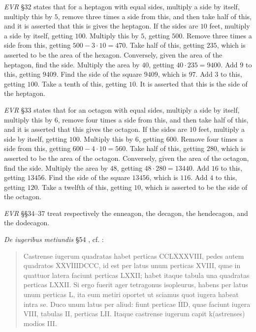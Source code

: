 \documentclass{amsart}
\theoremstyle{definition}
\begin{document}
{\em EVR} \S 32 \cite[pp.~176--179]{guillaumin} states that for a heptagon with equal sides, multiply a side by
itself, multiply this by $5$, remove three times a side from this, and then take half of this, and it is asserted that
this is gives the heptagon. If the sides are $10$ feet,
multiply a side by itself, getting $100$. Multiply this by $5$, getting $500$. Remove three times a side from this,
getting $500-3\cdot 10=470$. Take half of this, getting $235$, which is asserted to be the area of the hexagon.
Conversely,
given the area of the heptagon, find the side. Multiply the area by $40$, getting $40 \cdot 235 = 9400$.
Add $9$ to this, getting $9409$. Find the side of the square $9409$, which is $97$. Add $3$ to this, getting $100$.
Take a tenth of this, getting $10$. It is asserted that this is the side of the heptagon.

{\em EVR} \S 33 \cite[pp.~178--179]{guillaumin} states that for an octagon with equal sides, 
multiply a side by itself, multiply this by $6$, remove four times a side from this, and then take half of this, and it is asserted that this gives the octagon.
If the sides are $10$ feet, multiply a side by itself, getting $100$. Multiply this by $6$, getting $600$. Remove four times a side from this,
getting $600-4\cdot 10=560$. Take half of this, getting $280$, which is asserted to be the area of the octagon. Conversely,
given the area of the octagon, find the side. Multiply the area by $48$, getting $48 \cdot 280 = 13440$. Add $16$ to this, getting $13456$. Find the side
of the square $13456$, which is $116$. Add $4$ to this, getting $120$. Take a twelfth of this, getting $10$, which is asserted to be the side
of the octagon. 

{\em EVR} \S \S 34--37 \cite[pp.~180--187]{guillaumin} treat respectively the enneagon, the decagon, the hendecagon, and the dodecagon. 

{\em De iugeribus metiundis} \S 54 \cite[pp.~198--201]{guillaumin}, cf.  \cite[p.~354--356]{blumeI}:

\begin{quote}
Castrense iugerum quadratas habet perticas CCLXXXVIII, pedes autem quadratos $\overline{\text{X}} \overline{\text{X}} \overline{\text{VIII}}$DCCC, 
id est per latus unum perticas XVIII, quae in quattuor latera faciunt perticas LXXII; habet itaque tabula una quadratas perticas LXXII. Si ergo
fuerit ager tetragonus isopleurus, habens per latus unum perticas L, ita eum metiri oportet ut sciamus quot iugera habeat intra se. Duco unum latus
per aliud: fiunt perticae $\overline{\text{II}}$D, quae faciunt iugera VIII, tabulas II, perticas LII. Itaque castrense iugerum capit k(astrenses) modios III.
\end{quote}
\end{document}
